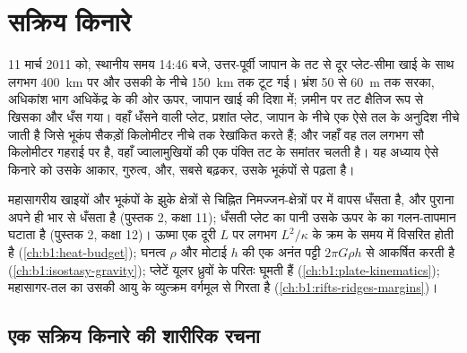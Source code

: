 \chapter{सक्रिय किनारे}\label{ch:b1:active-margins}

11 मार्च 2011 को, स्थानीय समय 14:46 बजे, उत्तर-पूर्वी जापान के तट से दूर प्लेट-सीमा खाई के साथ लगभग \qty{400}{km} पर और उसकी  के नीचे \qty{150}{km} तक टूट गई। भ्रंश 50 से \qty{60}{m} तक सरका, अधिकांश भाग अधिकेंद्र के  की ओर ऊपर, जापान खाई की दिशा में; ज़मीन पर तट क्षैतिज रूप से खिसका और धँस गया। वहाँ धँसने वाली प्लेट, प्रशांत प्लेट, जापान के नीचे एक ऐसे तल के अनुदिश नीचे जाती है जिसे भूकंप सैकड़ों किलोमीटर नीचे तक रेखांकित करते हैं; और जहाँ वह तल लगभग सौ किलोमीटर गहराई पर है, वहाँ ज्वालामुखियों की एक पंक्ति तट के समांतर चलती है। यह अध्याय ऐसे किनारे को उसके आकार, गुरुत्व,  और, सबसे बढ़कर, उसके भूकंपों से पढ़ता है।

\begin{recall}
महासागरीय  खाइयों और भूकंपों के झुके क्षेत्रों से चिह्नित निमज्जन-क्षेत्रों पर  में वापस धँसता है, और पुराना  अपने ही भार से धँसता है (पुस्तक 2, कक्षा 11); धँसती प्लेट का पानी उसके ऊपर के  का गलन-तापमान घटाता है (पुस्तक 2, कक्षा 12)। ऊष्मा एक दूरी $L$ पर लगभग $L^2/\kappa$ के क्रम के समय में विसरित होती है (\cref{ch:b1:heat-budget}); घनत्व $\rho$ और मोटाई $h$ की एक अनंत पट्टी $2\pi G\rho h$ से आकर्षित करती है (\cref{ch:b1:isostasy-gravity}); प्लेटें यूलर ध्रुवों के परितः घूमती हैं (\cref{ch:b1:plate-kinematics}); महासागर-तल का  उसकी आयु के व्युत्क्रम वर्गमूल से गिरता है (\cref{ch:b1:rifts-ridges-margins})।
\end{recall}

\section{एक सक्रिय किनारे की शारीरिक रचना}\label{sec:b1:active-margins:anatomy}


